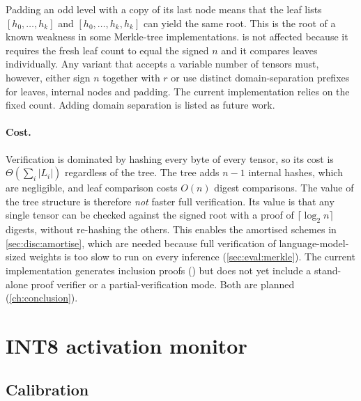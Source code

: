 \begin{remark}\label{rem:padding}
Padding an odd level with a copy of its last node means that the leaf lists $[h_0,\dots,h_{k}]$
and $[h_0,\dots,h_{k},h_{k}]$ can yield the same root. This is the root of a known weakness in
some Merkle-tree implementations.  is not affected because it requires the
fresh leaf count to equal the signed $n$ and it compares leaves individually. Any variant that
accepts a variable number of tensors must, however, either sign $n$ together with $r$ or use
distinct domain-separation prefixes for leaves, internal nodes and padding. The current
implementation relies on the fixed count. Adding domain separation is listed as future work.
\end{remark}

\paragraph{Cost.} Verification is dominated by hashing every byte of every tensor, so its cost is
$\Theta(\sum_i |L_i|)$ regardless of the tree. The tree adds $n-1$ internal hashes, which are
negligible, and leaf comparison costs $O(n)$ digest comparisons. The value of the tree structure is
therefore \emph{not} faster full verification. Its value is that any single tensor can be checked
against the signed root with a proof of $\lceil\log_2 n\rceil$ digests, without re-hashing the
others. This enables the amortised schemes in \cref{sec:disc:amortise}, which are needed because
full verification of language-model-sized weights is too slow to run on every inference
(\cref{sec:eval:merkle}). The current implementation generates inclusion proofs () but does
not yet include a stand-alone proof verifier or a partial-verification mode. Both are planned
(\cref{ch:conclusion}).

\section{INT8 activation monitor}
\label{sec:design:monitor}

\subsection{Calibration}

